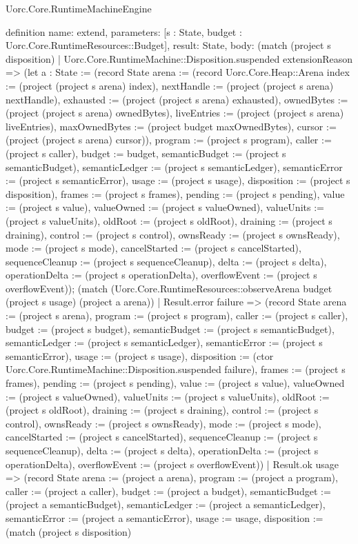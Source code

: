 \begin{lexlean}{Uorc.Core.RuntimeMachineEngine}
\begin{semanticmodule}
definition{
  name: extend,
  parameters: [s : State, budget : Uorc.Core.RuntimeResources::Budget],
  result: State,
  body: (match (project s disposition)
    | Uorc.Core.RuntimeMachine::Disposition.suspended extensionReason => (let a : State := (record State {arena := (record Uorc.Core.Heap::Arena {index := (project (project s arena) index), nextHandle := (project (project s arena) nextHandle), exhausted := (project (project s arena) exhausted), ownedBytes := (project (project s arena) ownedBytes), liveEntries := (project (project s arena) liveEntries), maxOwnedBytes := (project budget maxOwnedBytes), cursor := (project (project s arena) cursor)}), program := (project s program), caller := (project s caller), budget := budget, semanticBudget := (project s semanticBudget), semanticLedger := (project s semanticLedger), semanticError := (project s semanticError), usage := (project s usage), disposition := (project s disposition), frames := (project s frames), pending := (project s pending), value := (project s value), valueOwned := (project s valueOwned), valueUnits := (project s valueUnits), oldRoot := (project s oldRoot), draining := (project s draining), control := (project s control), ownsReady := (project s ownsReady), mode := (project s mode), cancelStarted := (project s cancelStarted), sequenceCleanup := (project s sequenceCleanup), delta := (project s delta), operationDelta := (project s operationDelta), overflowEvent := (project s overflowEvent)}); (match (Uorc.Core.RuntimeResources::observeArena budget (project s usage) (project a arena))
      | Result.error failure => (record State {arena := (project s arena), program := (project s program), caller := (project s caller), budget := (project s budget), semanticBudget := (project s semanticBudget), semanticLedger := (project s semanticLedger), semanticError := (project s semanticError), usage := (project s usage), disposition := (ctor Uorc.Core.RuntimeMachine::Disposition.suspended failure), frames := (project s frames), pending := (project s pending), value := (project s value), valueOwned := (project s valueOwned), valueUnits := (project s valueUnits), oldRoot := (project s oldRoot), draining := (project s draining), control := (project s control), ownsReady := (project s ownsReady), mode := (project s mode), cancelStarted := (project s cancelStarted), sequenceCleanup := (project s sequenceCleanup), delta := (project s delta), operationDelta := (project s operationDelta), overflowEvent := (project s overflowEvent)})
      | Result.ok usage => (record State {arena := (project a arena), program := (project a program), caller := (project a caller), budget := (project a budget), semanticBudget := (project a semanticBudget), semanticLedger := (project a semanticLedger), semanticError := (project a semanticError), usage := usage, disposition := (match (project s disposition)
}}
\end{semanticmodule}
\end{lexlean}
